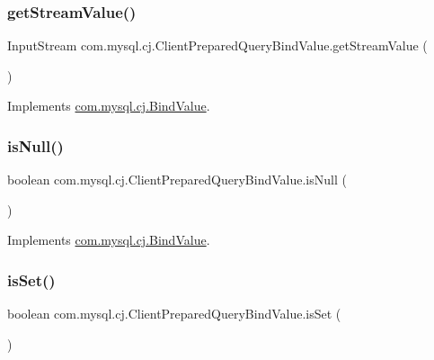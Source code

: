 \subsubsection{\texorpdfstring{get\+Stream\+Value()}{getStreamValue()}}
{\footnotesize\ttfamily Input\+Stream com.\+mysql.\+cj.\+Client\+Prepared\+Query\+Bind\+Value.\+get\+Stream\+Value (\begin{DoxyParamCaption}{ }\end{DoxyParamCaption})}



Implements \mbox{\hyperlink{interfacecom_1_1mysql_1_1cj_1_1_bind_value_aee74c54d4ba871b7e63cf8a76d3f04fd}{com.\+mysql.\+cj.\+Bind\+Value}}.

\mbox{\label{classcom_1_1mysql_1_1cj_1_1_client_prepared_query_bind_value_ae4e7ad98b2e3a345ed4313d999e4d3a5}} 
\subsubsection{\texorpdfstring{is\+Null()}{isNull()}}
{\footnotesize\ttfamily boolean com.\+mysql.\+cj.\+Client\+Prepared\+Query\+Bind\+Value.\+is\+Null (\begin{DoxyParamCaption}{ }\end{DoxyParamCaption})}



Implements \mbox{\hyperlink{interfacecom_1_1mysql_1_1cj_1_1_bind_value_af0ec3dd14fdf2d01af7e7195ef43369a}{com.\+mysql.\+cj.\+Bind\+Value}}.

\mbox{\label{classcom_1_1mysql_1_1cj_1_1_client_prepared_query_bind_value_af2831a168b2afe1d429903340c13af2f}} 
\subsubsection{\texorpdfstring{is\+Set()}{isSet()}}
{\footnotesize\ttfamily boolean com.\+mysql.\+cj.\+Client\+Prepared\+Query\+Bind\+Value.\+is\+Set (\begin{DoxyParamCaption}{ }\end{DoxyParamCaption})}



